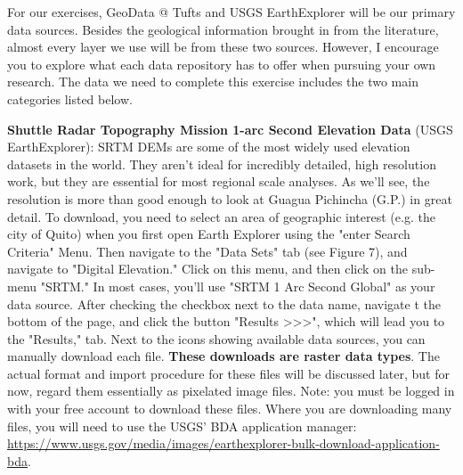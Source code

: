 \documentclass{article}
\begin{document}
For our exercises, GeoData @ Tufts and USGS EarthExplorer will be our primary data sources. Besides the geological information brought in from the literature, almost every layer we use will be from these two sources. However, I encourage you to explore what each data repository has to offer when pursuing your own research. The data we need to complete this exercise includes the two main categories listed below.

\textbf{Shuttle Radar Topography Mission 1-arc Second Elevation Data} (USGS EarthExplorer): SRTM DEMs are some of the most widely used elevation datasets in the world. They aren't ideal for incredibly detailed, high resolution work, but they are essential for most regional scale analyses. As we'll see, the resolution is more than good enough to look at Guagua Pichincha (G.P.) in great detail. To download, you need to select an area of geographic interest (e.g. the city of Quito) when you first open Earth Explorer using the "enter Search Criteria" Menu. Then navigate to the "Data Sets" tab (see Figure 7), and navigate to "Digital Elevation." Click on this menu, and then click on the sub-menu "SRTM." In most cases, you'll use "SRTM 1 Arc Second Global" as your data source. After checking the checkbox next to the data name, navigate t the bottom of the page, and click the button "Results >>>", which will lead you to the "Results," tab. Next to the icons showing available data sources, you can manually download each file. \textbf{These downloads are raster data types}. The actual format and import procedure for these files will be discussed later, but for now, regard them essentially as pixelated image files. Note: you must be logged in with your free account to download these files. Where you are downloading many files, you will need to use the USGS' BDA application manager: \url{https://www.usgs.gov/media/images/earthexplorer-bulk-download-application-bda}.
\end{document}
